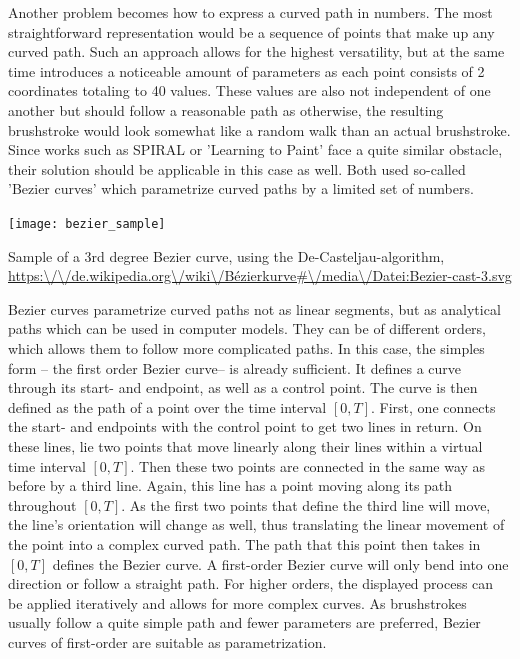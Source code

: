 Another problem becomes how to express a curved path in numbers.
The most straightforward representation would be a sequence of points that make up any curved path.
Such an approach allows for the highest versatility, but at the same time introduces a noticeable amount of parameters as each point consists of 2 coordinates totaling to 40 values.
These values are also not independent of one another but should follow a reasonable path as otherwise, the resulting brushstroke would look somewhat like a random walk than an actual brushstroke.
Since works such as SPIRAL or 'Learning to Paint' face a quite similar obstacle, their solution should be applicable in this case as well.
Both used so-called 'Bezier curves' which parametrize curved paths by a limited set of numbers.
\begin{marginfigure}
    \texttt{[image: bezier\_sample]}
    \caption[]{Sample of a 3rd degree Bezier curve, using the De-Casteljau-algorithm,
    \url{https:\/\/de.wikipedia.org\/wiki\/Bézierkurve\#\/media\/Datei:Bezier-cast-3.svg}}
\end{marginfigure}

Bezier curves parametrize curved paths not as linear segments, but as analytical paths which can be used in computer models.
They can be of different orders, which allows them to follow more complicated paths.
In this case, the simples form -- the first order Bezier curve-- is already sufficient.
It defines a curve through its start- and endpoint, as well as a control point.
The curve is then defined as the path of a point over the time interval $[0, T]$.
First, one connects the start- and endpoints with the control point to get two lines in return.
On these lines, lie two points that move linearly along their lines within a virtual time interval $[0, T]$.
Then these two points are connected in the same way as before by a third line.
Again, this line has a point moving along its path throughout $[0, T]$.
As the first two points that define the third line will move, the line's orientation will change as well, thus translating the linear movement of the point into a complex curved path.
The path that this point then takes in $[0, T]$ defines the Bezier curve.
A first-order Bezier curve will only bend into one direction or follow a straight path.
For higher orders, the displayed process can be applied iteratively and allows for more complex curves.
As brushstrokes usually follow a quite simple path and fewer parameters are preferred, Bezier curves of first-order are suitable as parametrization.

